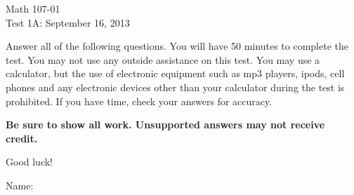 \documentclass[12pt]{article}
\begin{document}
\pagestyle{empty}


\begin{center}

Math 107-01\\
Test 1A: September 16, 2013
\end{center}

\begin{small} Answer all of the following questions.  You will have 50 minutes to complete the
test. You may not use any outside assistance on this test.  You may use a
calculator, but the use of
electronic equipment such as mp3 players, ipods, cell phones and any
electronic devices other than your calculator during the test is
prohibited.  If you have time, check your answers for accuracy.

\textbf{Be sure to show all work. Unsupported answers may not
receive credit.}

Good luck!\end{small}


Name: \underline{\qquad \qquad \qquad \qquad \qquad \qquad \qquad \qquad \qquad \qquad}\\
\end{document}

